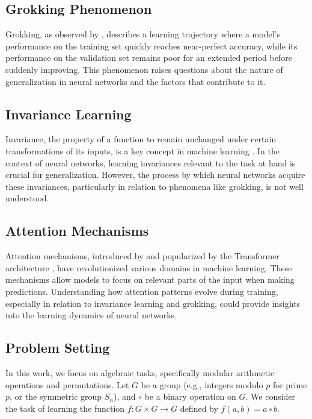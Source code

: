 \documentclass{article} %
\begin{document}
\subsection{Grokking Phenomenon}
Grokking, as observed by \citet{power2022grokking}, describes a learning trajectory where a model's performance on the training set quickly reaches near-perfect accuracy, while its performance on the validation set remains poor for an extended period before suddenly improving. This phenomenon raises questions about the nature of generalization in neural networks and the factors that contribute to it.

\subsection{Invariance Learning}
Invariance, the property of a function to remain unchanged under certain transformations of its inputs, is a key concept in machine learning \citep{goodfellow2016deep}. In the context of neural networks, learning invariances relevant to the task at hand is crucial for generalization. However, the process by which neural networks acquire these invariances, particularly in relation to phenomena like grokking, is not well understood.

\subsection{Attention Mechanisms}
Attention mechanisms, introduced by \citet{bahdanau2014neural} and popularized by the Transformer architecture \citep{vaswani2017attention}, have revolutionized various domains in machine learning. These mechanisms allow models to focus on relevant parts of the input when making predictions. Understanding how attention patterns evolve during training, especially in relation to invariance learning and grokking, could provide insights into the learning dynamics of neural networks.

\subsection{Problem Setting}
In this work, we focus on algebraic tasks, specifically modular arithmetic operations and permutations. Let $G$ be a group (e.g., integers modulo $p$ for prime $p$, or the symmetric group $S_n$), and $\circ$ be a binary operation on $G$. We consider the task of learning the function $f: G \times G \rightarrow G$ defined by $f(a,b) = a \circ b$.
\end{document}
